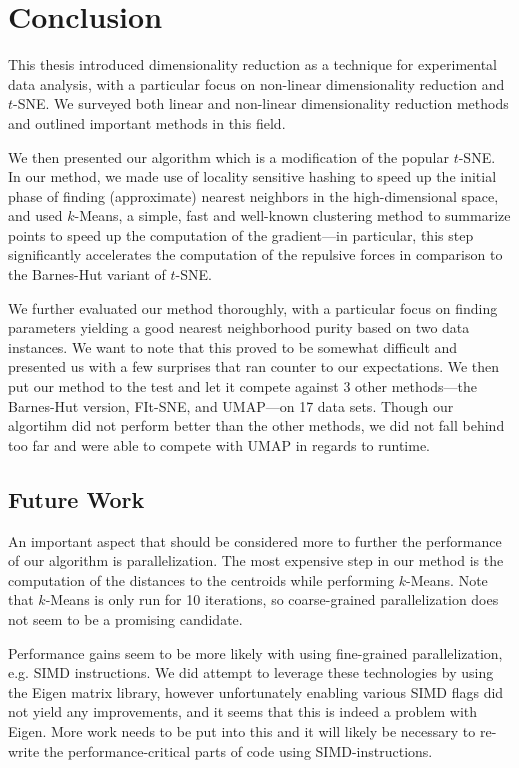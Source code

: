 \chapter{Conclusion}\label{ch:end}

This thesis introduced dimensionality reduction as a technique for experimental
data analysis, with a particular focus on non-linear dimensionality reduction
and $t$-SNE. We surveyed both linear and non-linear dimensionality reduction
methods and outlined important methods in this field.

We then presented our algorithm which is a modification of the popular $t$-SNE.
In our method, we made use of locality sensitive hashing to speed up the initial
phase of finding (approximate) nearest neighbors in the high-dimensional space,
and used $k$-Means, a simple, fast and well-known clustering method to summarize
points to speed up the computation of the gradient---in particular, this step significantly
accelerates the computation of the repulsive forces in comparison to the Barnes-Hut
variant of $t$-SNE.

We further evaluated our method thoroughly, with a particular focus on finding parameters
yielding a good nearest neighborhood purity based on two data instances. We want to note that
this proved to be somewhat difficult and presented us with a few surprises that ran
counter to our expectations. We then put our method to the test and let it compete against
3 other methods---the Barnes-Hut version, FIt-SNE, and UMAP---on 17 data sets. Though
our algortihm did not perform better than the other methods, we did not fall behind too
far and were able to compete with UMAP in regards to runtime.

\section{Future Work}

An important aspect that should be considered more to further the performance of our algorithm is parallelization.
The most expensive step in our method is the computation of the distances to the centroids while
performing $k$-Means. Note that $k$-Means is only run for 10 iterations, so coarse-grained
parallelization does not seem to be a promising candidate.

Performance gains seem to be more
likely with using fine-grained parallelization, e.g. SIMD instructions. We did attempt to
leverage these technologies by using the Eigen matrix library, however unfortunately enabling
various SIMD flags did not yield any improvements, and it seems that this is indeed a problem
with Eigen. More work needs to be put into this and it will likely be necessary to re-write
the performance-critical parts of code using SIMD-instructions.

